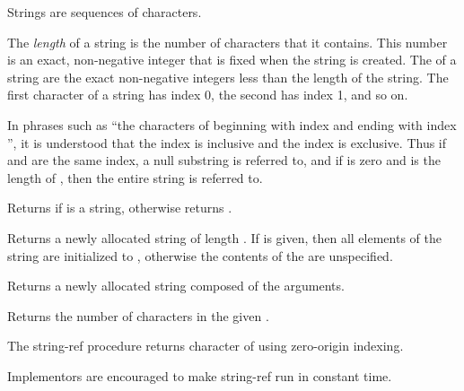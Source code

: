 Strings are sequences of characters.  

\vest The {\em length} of a string is the number of characters that it
contains.  This number is an exact, non-negative integer that is fixed when the
string is created.  The  of a string are the
exact non-negative integers less than the length of the string.  The first
character of a string has index 0, the second has index 1, and so on.

\vest In phrases such as ``the characters of  beginning with
index  and ending with index '', it is understood
that the index  is inclusive and the index  is
exclusive.  Thus if  and  are the same index, a null
substring is referred to, and if  is zero and  is
the length of , then the entire string is referred to.

\begin{entry}{%
}

Returns \schtrue{} if  is a string, otherwise returns \schfalse.
\end{entry}


\begin{entry}{%
}

Returns a newly allocated string of
length .  If  is given, then all elements of the string
are initialized to , otherwise the contents of the
 are unspecified.

\end{entry}

\begin{entry}{%
}

Returns a newly allocated string composed of the arguments.

\end{entry}

\begin{entry}{%
}

Returns the number of characters in the given .
\end{entry}


\begin{entry}{%
}

The {\cf string-ref} procedure returns character  of  using zero-origin indexing.
\begin{note}
  Implementors are encouraged to make {\cf string-ref} run in constant
  time.
\end{note}
\end{entry}

